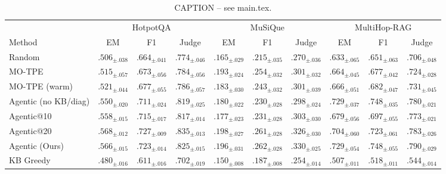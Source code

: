 \begin{table}[t]
\centering
\footnotesize
\setlength{\tabcolsep}{1.5pt}
\begin{tabular}{@{}l ccc ccc ccc@{}}
\toprule
& \multicolumn{3}{c}{HotpotQA} & \multicolumn{3}{c}{MuSiQue} & \multicolumn{3}{c}{MultiHop-RAG} \\
\cmidrule(lr){2-4} \cmidrule(lr){5-7} \cmidrule(lr){8-10}
Method & EM & F1 & Judge & EM & F1 & Judge & EM & F1 & Judge \\
\midrule
Random & $.506_{\pm .038}$ & $.664_{\pm .041}$ & $.774_{\pm .046}$ & $.165_{\pm .029}$ & $.215_{\pm .035}$ & $.270_{\pm .036}$ & $.633_{\pm .065}$ & $.651_{\pm .063}$ & $.706_{\pm .048}$ \\
MO-TPE & $.515_{\pm .057}$ & $.673_{\pm .056}$ & $.784_{\pm .056}$ & $.193_{\pm .024}$ & $.254_{\pm .032}$ & $.301_{\pm .032}$ & $.664_{\pm .045}$ & $.677_{\pm .042}$ & $.724_{\pm .028}$ \\
MO-TPE (warm) & $.521_{\pm .044}$ & $.677_{\pm .055}$ & $.786_{\pm .057}$ & $.183_{\pm .030}$ & $.243_{\pm .032}$ & $.301_{\pm .039}$ & $.666_{\pm .051}$ & $.682_{\pm .047}$ & $.731_{\pm .045}$ \\
Agentic (no KB/diag) & $.550_{\pm .020}$ & $.711_{\pm .024}$ & $.819_{\pm .025}$ & $.180_{\pm .022}$ & $.230_{\pm .028}$ & $.298_{\pm .024}$ & $\mathbf{.729}_{\pm .037}$ & $\mathbf{.748}_{\pm .035}$ & $.780_{\pm .021}$ \\
Agentic@10 & $.558_{\pm .015}$ & $.715_{\pm .017}$ & $.817_{\pm .014}$ & $.177_{\pm .023}$ & $.231_{\pm .028}$ & $.303_{\pm .030}$ & $.679_{\pm .056}$ & $.697_{\pm .055}$ & $.773_{\pm .021}$ \\
Agentic@20 & $\mathbf{.568}_{\pm .012}$ & $\mathbf{.727}_{\pm .009}$ & $\mathbf{.835}_{\pm .013}$ & $\mathbf{.198}_{\pm .027}$ & $.261_{\pm .028}$ & $.326_{\pm .030}$ & $.704_{\pm .060}$ & $.723_{\pm .061}$ & $.783_{\pm .026}$ \\
Agentic (Ours) & $.566_{\pm .015}$ & $.723_{\pm .014}$ & $.825_{\pm .015}$ & $.196_{\pm .031}$ & $\mathbf{.262}_{\pm .028}$ & $\mathbf{.330}_{\pm .025}$ & $\mathbf{.729}_{\pm .054}$ & $\mathbf{.748}_{\pm .055}$ & $\mathbf{.790}_{\pm .029}$ \\
\midrule
KB Greedy & $.480_{\pm .016}$ & $.611_{\pm .016}$ & $.702_{\pm .019}$ & $.150_{\pm .008}$ & $.187_{\pm .008}$ & $.254_{\pm .014}$ & $.507_{\pm .011}$ & $.518_{\pm .011}$ & $.544_{\pm .014}$ \\
\bottomrule
\end{tabular}
\caption{CAPTION -- see main.tex.}
\label{tab:holdout}
\end{table}
